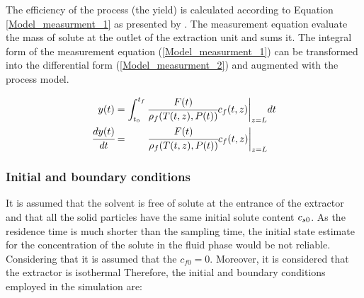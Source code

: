 \documentclass[../Article_Model_Parameters.tex]{subfiles}
\begin{document}
		The efficiency of the process (the yield) is calculated according to Equation \ref{Model_measurment_1} as presented by \citet{Sovova1994a}. The measurement equation evaluate the mass of solute at the outlet of the extraction unit and sums it. The integral form of the measurement equation (\ref{Model_measurment_1}) can be transformed into the differential form (\ref{Model_measurment_2}) and augmented with the process model.
			
		{\footnotesize
			\begin{align} 
				\label{Model_measurment_1}
				{\color{black}y}(t) &= \int_{t_0}^{t_f} \cfrac{{\color{black}F}(t)}{{\color{black}\rho_f}({\color{black}T}(t,z),{\color{black}P}(t))} {\color{black}c_f}(t,z) \biggr\rvert_{z=L} dt \\
				\cfrac{d{\color{black}y}(t)}{dt} &= \qquad \cfrac{{\color{black}F}(t)}{{\color{black}\rho_f}({\color{black}T}(t,z),{\color{black}P}(t))} {\color{black}c_f}(t,z) \biggr\rvert_{z=L} 
                \label{Model_measurment_2}
		\end{align}	}
  
		\subsubsection{Initial and boundary conditions} 
		It is assumed that the solvent is free of solute at the entrance of the extractor and that all the solid particles have the same initial solute content ${\color{black}c_{s0}}$. As the residence time is much shorter than the sampling time, the initial state estimate for the concentration of the solute in the fluid phase would be not reliable. Considering that it is assumed that the $c_{f0}=0$. Moreover, it is considered that the extractor is isothermal %
		Therefore, the initial and boundary conditions employed in the simulation are:
			

			
\end{document}
